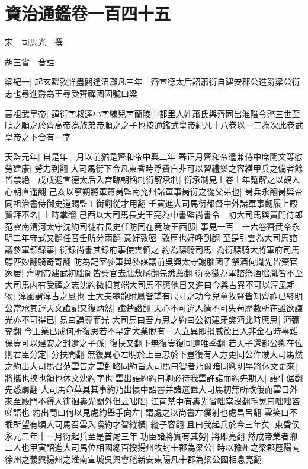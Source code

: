 \chapter{資治通鑑卷一百四十五}
宋　司馬光　撰

胡三省　音註

梁紀一|{
	起玄黓敦牂盡閼逢涒灘凡三年　齊宣德太后詔蕭衍自建安郡公進爵梁公衍志也尋進爵為王尋受齊禪國因號曰梁}


高祖武皇帝|{
	諱衍字叔達小字練兒南蘭陵中都里人姓蕭氏與齊同出淮陰令整三世至順之順之於齊高帝為族弟帝順之之子也按通鑑武皇帝紀凡十八卷以一二為次此卷武皇帝之下合有一字}


天監元年|{
	自是年三月以前猶是齊和帝中興二年}
春正月齊和帝遣兼侍中席闡文等慰勞建康|{
	勞力到翻}
大司馬衍下令凡東昏時浮費自非可以習禮樂之容繕甲兵之備者餘皆禁絶　戊戌迎宣德太后入宫臨朝稱制衍解承制|{
	衍承制見上卷上年蹔解之以覘人心朝直遥翻}
己亥以寧朔將軍蕭昺監南兖州諸軍事昺衍之從父弟也|{
	昺兵永翻昺與帝同祖治書侍御史道賜監工衘翻從才用翻}
壬寅進大司馬衍都督中外諸軍事劒履上殿贊拜不名|{
	上時掌翻}
己酉以大司馬長史王亮為中書監尚書令　初大司馬與黃門侍郎范雲南清河太守沈約司徒右長史任昉同在竟陵王西邸|{
	事見一百三十六卷齊武帝永明二年守式又翻任音壬昉分兩翻}
意好敦密|{
	敦厚也好呼到翻}
至是引雲為大司馬諮議參軍領録事|{
	衍録尚書其録府事使雲領之}
約為驃騎司馬|{
	為衍驃騎大將軍府司馬驃匹妙翻騎奇寄翻}
昉為記室參軍與參謀議前吳興太守謝朏國子祭酒何胤先皆棄官家居|{
	齊明帝建武初朏胤皆棄官去朏敷尾翻先悉薦翻}
衍奏徵為軍諮祭酒朏胤皆不至大司馬内有受禪之志沈約微扣其端大司馬不應他日又進曰今與古異不可以淳風期物|{
	淳風謂淳古之風也}
士大夫攀龍附鳳皆望有尺寸之功今兒童牧豎皆知齊祚已終明公當承其運天文䜟記又復炳然|{
	䜟楚譖翻}
天心不可違人情不可失苟歷數所在雖欲謙光亦不可得已|{
	易曰謙尊而光}
大司馬曰吾方思之約曰公初建牙樊沔此時應思|{
	沔彌兖翻}
今王業已成何所復思若不早定大業脫有一人立異即損威德且人非金石時事難保豈可以建安之封遺之子孫|{
	復扶又翻下無復豈復同遺唯季翻}
若天子還都公卿在位則君臣分定|{
	分扶問翻}
無復異心君明於上臣忠於下豈復有人方更同公作賊大司馬然之約出大司馬召范雲告之雲對略同約旨大司馬曰智者乃爾暗同卿明早將休文更來|{
	將攜也挾也領也休文沈約字也}
雲出語約約曰卿必待我雲許諾而約先期入|{
	語牛倨翻先悉薦翻}
大司馬命草具其事約乃出懷中詔書并諸選置大司馬初無所改俄而雲自外來至殿門不得入徘徊夀光閣外但云咄咄|{
	江南禁中有夀光省咄當沒翻毛晃曰咄咄咨嗟語也}
約出問曰何以見處約舉手向左|{
	謂處之以尚書左僕射也處昌呂翻}
雲笑曰不乖所望有頃大司馬召雲入嘆約才智縱橫|{
	縱子容翻}
且曰我起兵於今三年矣|{
	東昏侯永元二年十一月衍起兵至是首尾三年}
功臣諸將實有其勞|{
	將即亮翻}
然成帝業者卿二人也甲寅詔進大司馬位相國總百揆揚州牧封十郡為梁公|{
	時以豫州之梁郡歷陽南徐州之義興揚州之淮南宣城吳興會稽新安東陽凡十郡為梁公國相息亮翻}
